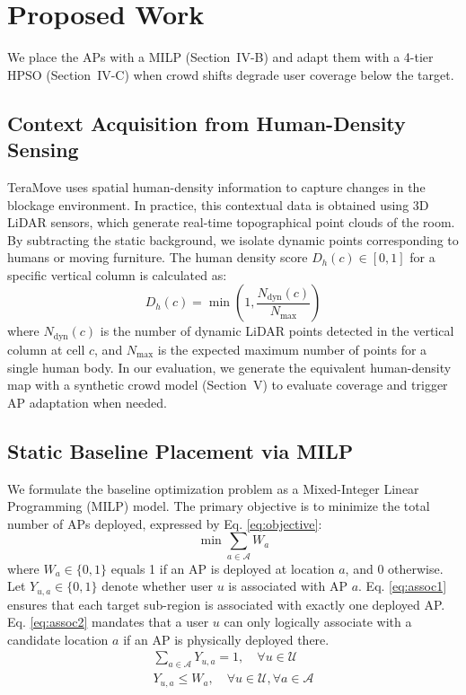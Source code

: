 \documentclass[conference]{IEEEtran}
\begin{document}
	\section{Proposed Work}

	We place the APs with a MILP (Section~IV-B) and adapt them with a 4-tier HPSO (Section~IV-C) when crowd shifts degrade user coverage below the target.

	\subsection{Context Acquisition from Human-Density Sensing}

	TeraMove uses spatial human-density information to capture changes in the blockage environment. In practice, this contextual data is obtained using 3D LiDAR sensors, which generate real-time topographical point clouds of the room. By subtracting the static background, we isolate dynamic points corresponding to humans or moving furniture. The human density score $D_h(c) \in [0,1]$ for a specific vertical column is calculated as:
	\begin{equation}
		D_h(c) = \min \left(1, \frac{N_{\text{dyn}}(c)}{N_{\text{max}}} \right)
	\end{equation}
	where $N_{\text{dyn}}(c)$ is the number of dynamic LiDAR points detected in the vertical column at cell $c$, and $N_{\text{max}}$ is the expected maximum number of points for a single human body. In our evaluation, we generate the equivalent human-density map with a synthetic crowd model (Section~V) to evaluate coverage and trigger AP adaptation when needed.

	\subsection{Static Baseline Placement via MILP}

	We formulate the baseline optimization problem as a Mixed-Integer Linear Programming (MILP) model. The primary objective is to minimize the total number of APs deployed, expressed by Eq. \eqref{eq:objective}:
	\begin{equation}
		\min \sum_{a \in \mathcal{A}} W_a
		\label{eq:objective}
	\end{equation}
	where $W_a \in \{0,1\}$ equals 1 if an AP is deployed at location $a$, and 0 otherwise. Let $Y_{u,a} \in \{0,1\}$ denote whether user $u$ is associated with AP $a$. Eq. \eqref{eq:assoc1} ensures that each target sub-region is associated with exactly one deployed AP. Eq. \eqref{eq:assoc2} mandates that a user $u$ can only logically associate with a candidate location $a$ if an AP is physically deployed there.
	\begin{gather}
		\sum_{a \in \mathcal{A}} Y_{u,a} = 1, \quad \forall u \in \mathcal{U}
		\label{eq:assoc1} \\
		Y_{u,a} \le W_a, \quad \forall u \in \mathcal{U}, \forall a \in \mathcal{A}
		\label{eq:assoc2}
	\end{gather}
\end{document}
